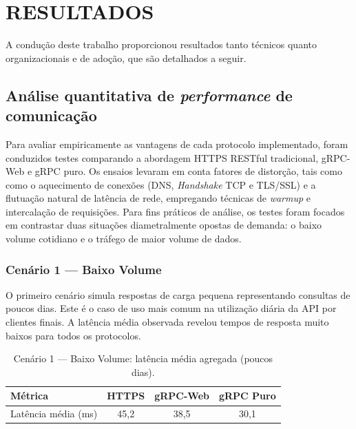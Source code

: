 \chapter{RESULTADOS}

A condução deste trabalho proporcionou resultados tanto técnicos quanto organizacionais e de adoção, que são detalhados a seguir.

\section{Análise quantitativa de \textit{performance} de comunicação}

Para avaliar empiricamente as vantagens de cada protocolo implementado, foram conduzidos testes comparando a abordagem HTTPS RESTful tradicional, gRPC-Web e gRPC puro. Os ensaios levaram em conta fatores de distorção, tais como como o aquecimento de conexões (DNS, \textit{Handshake} TCP e TLS/SSL) e a flutuação natural de latência de rede, empregando técnicas de \textit{warmup} e intercalação de requisições. Para fins práticos de análise, os testes foram focados em contrastar duas situações diametralmente opostas de demanda: o baixo volume cotidiano e o tráfego de maior volume de dados.

\subsection{Cenário 1 — Baixo Volume}
\label{sec:cenario1}

O primeiro cenário simula respostas de carga pequena representando consultas de poucos dias. Este é o caso de uso mais comum na utilização diária da API por clientes finais. A latência média observada revelou tempos de resposta muito baixos para todos os protocolos.

\begin{table}[H]
  \centering
  \caption{Cenário 1 — Baixo Volume: latência média agregada (poucos dias).}
  \label{tab:cenario1-summary}
  \begin{tabular}{l S[table-format=3.2] S[table-format=3.2] S[table-format=3.2]}
    \toprule
    \textbf{Métrica} & {\textbf{HTTPS}} & {\textbf{gRPC-Web}} & {\textbf{gRPC Puro}} \\
    \midrule
    Latência média (ms) & 45,2 & 38,5 & 30,1 \\
    \bottomrule
  \end{tabular}
\end{table}

